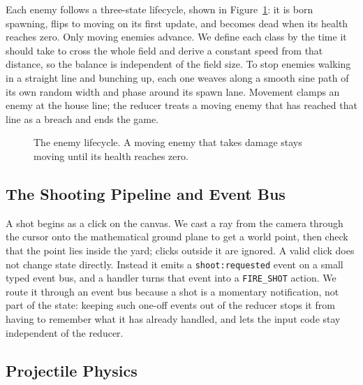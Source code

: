 \documentclass[12pt,a4paper]{report}
\begin{document}
Each enemy follows a three-state lifecycle, shown in Figure~\ref{fig:enemystate}:
it is born spawning, flips to moving on its first update, and becomes dead when
its health reaches zero. Only moving enemies advance. We define each class by the
time it should take to cross the whole field and derive a constant speed from
that distance, so the balance is independent of the field size. To stop enemies
walking in a straight line and bunching up, each one weaves along a smooth sine
path of its own random width and phase around its spawn lane. Movement clamps an
enemy at the house line; the reducer treats a moving enemy that has reached that
line as a breach and ends the game.

\begin{figure}[htbp]
\centering
{}
\caption{The enemy lifecycle. A moving enemy that takes damage stays moving
until its health reaches zero.}
\label{fig:enemystate}
\end{figure}

\subsection{The Shooting Pipeline and Event Bus}

A shot begins as a click on the canvas. We cast a ray from the camera through the
cursor onto the mathematical ground plane to get a world point, then check that
the point lies inside the yard; clicks outside it are ignored. A valid click does
not change state directly. Instead it emits a \texttt{shoot:requested} event on a
small typed event bus, and a handler turns that event into a \texttt{FIRE\_SHOT}
action. We route it through an event bus because a shot is a momentary
notification, not part of the state: keeping such one-off events out of the
reducer stops it from having to remember what it has already handled, and lets
the input code stay independent of the reducer.

\subsection{Projectile Physics}
\end{document}
